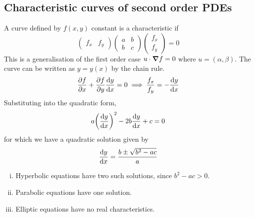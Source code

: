 \subsection{Characteristic curves of second order PDEs}
A curve defined by \( f(x,y) \) constant is a characteristic if
\[
	\begin{pmatrix}
		f_x & f_y
	\end{pmatrix} \begin{pmatrix}
		a & b \\
		b & c
	\end{pmatrix} \begin{pmatrix}
		f_x \\ f_y
	\end{pmatrix} = 0
\]
This is a generalisation of the first order case \( u \cdot \grad{f} = 0 \) where \( u = (\alpha, \beta) \).
The curve can be written as \( y = y(x) \) by the chain rule.
\[
	\pdv{f}{x} + \pdv{f}{y} \dv{y}{x} = 0 \implies \frac{f_x}{f_y} = -\dv{y}{x}
\]
Substituting into the quadratic form,
\[
	a \qty(\dv{y}{x})^2 - 2b \dv{y}{x} + c = 0
\]
for which we have a quadratic solution given by
\[
	\dv{y}{x} = \frac{b \pm \sqrt{b^2 - ac}}{a}
\]
\begin{enumerate}[(i)]
	\item Hyperbolic equations have two such solutions, since \( b^2 - ac > 0 \).
	\item Parabolic equations have one solution.
	\item Elliptic equations have no real characteristics.
\end{enumerate}

